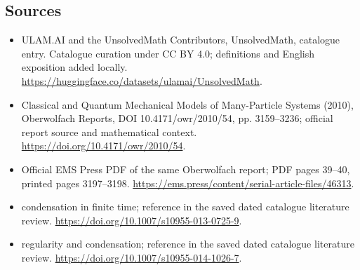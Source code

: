 \documentclass[11pt]{article}
\begin{document}
\subsection{Sources}
\begin{itemize}
\item[\hypertarget{source:statement:1}{S1}] ULAM.AI and the UnsolvedMath Contributors, UnsolvedMath, catalogue entry. Catalogue curation under CC BY 4.0; definitions and English exposition added locally.
\url{https://huggingface.co/datasets/ulamai/UnsolvedMath}.
\item[\hypertarget{source:statement:2}{S2}] Classical and Quantum Mechanical Models of Many-Particle Systems (2010), Oberwolfach Reports, DOI 10.4171/owr/2010/54, pp. 3159--3236; official report source and mathematical context.
\url{https://doi.org/10.4171/owr/2010/54}.
\item[\hypertarget{source:statement:3}{S3}] Official EMS Press PDF of the same Oberwolfach report; PDF pages 39--40, printed pages 3197--3198.
\url{https://ems.press/content/serial-article-files/46313}.
\item[\hypertarget{source:statement:4}{S4}] condensation in finite time; reference in the saved dated catalogue literature review.
\url{https://doi.org/10.1007/s10955-013-0725-9}.
\item[\hypertarget{source:statement:5}{S5}] regularity and condensation; reference in the saved dated catalogue literature review.
\url{https://doi.org/10.1007/s10955-014-1026-7}.
\end{itemize}
\label{end:statement}
\end{document}
